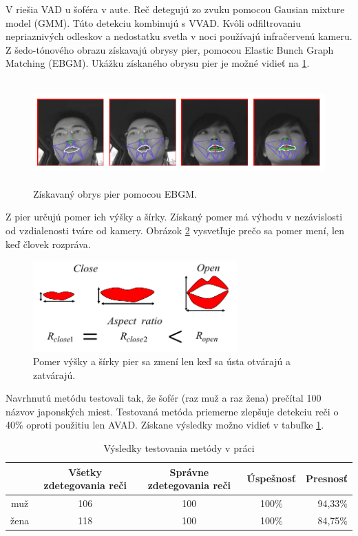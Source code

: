 V \cite{aoki2007voice} riešia VAD u šoféra v aute.
Reč detegujú zo zvuku pomocou Gausian mixture model (GMM).
Túto detekciu kombinujú s VVAD.
Kvôli odfiltrovaniu nepriaznivých odleskov a nedostatku svetla v noci používajú infračervenú kameru.
Z šedo-tónového obrazu získavajú obrysy pier, pomocou Elastic Bunch Graph Matching (EBGM).
Ukážku získaného obrysu pier je možné vidieť na \ref{pic-EBGM}. 

\begin{figure}[H]
	\begin{center}
		\includegraphics[height=4cm]{pics/EBGM.png}
		\caption{Získavaný obrys pier pomocou EBGM.
		 \cite{aoki2007voice}}
		\label{pic-EBGM}
	\end{center}
\end{figure}

Z pier určujú pomer ich výšky a šírky.
Získaný pomer má výhodu v nezávislosti od vzdialenosti tváre od kamery.
Obrázok \ref{pic-pery} vysvetľuje prečo sa pomer mení, len keď človek rozpráva.

\begin{figure}[H]
	\begin{center}
		\includegraphics[height=3.5cm]{pics/pery.png}
		\caption{Pomer výšky a šírky pier sa zmení len keď sa ústa otvárajú a zatvárajú.
		 \cite{aoki2007voice}}
		\label{pic-pery}
	\end{center}
\end{figure}

Navrhnutú metódu testovali tak, že šofér (raz muž a raz žena) prečítal 100 názvov japonských miest.
Testovaná metóda priemerne zlepšuje detekciu reči o 40\% oproti použitiu len AVAD.  
Získane výsledky možno vidieť v tabuľke \ref{tab-results}.

\begin{table}[H]
	\begin{center}
		\begin{tabular}{|c|c|c|c|r|}
			\hline
			& Všetky zdetegovania reči & Správne zdetegovania reči & Úspešnosť & Presnosť \\
			\hline
			muž & 106 & 100 & 100\% & 94,33\%\\
			\hline
			žena & 118 & 100 & 100\% & 84,75\%\\
			\hline
		\end{tabular}
	\end{center}
	\caption{Výsledky testovania metódy v práci \cite{aoki2007voice}}
	\label{tab-results}
\end{table}

